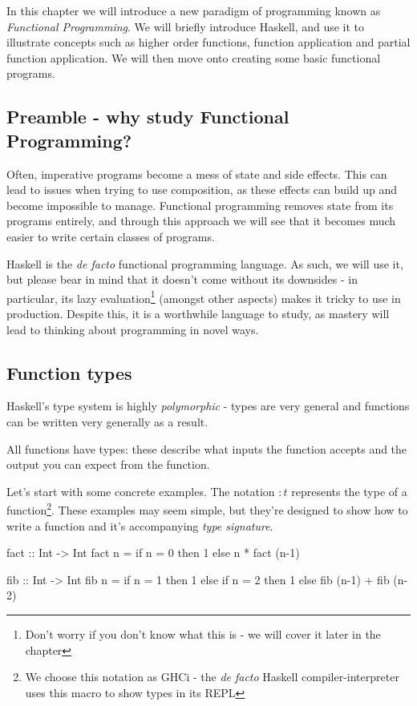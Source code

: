 \documentclass[../alevelcs.tex]{subfiles}
\begin{document}
	In this chapter we will introduce a new paradigm of programming known as \textit{Functional Programming}. We will briefly introduce Haskell, and use it to illustrate concepts such as higher order functions, function application and partial function application. We will then move onto creating some basic functional programs.
	\tableofcontents
	\newpage
	
	\subsection{Preamble - why study Functional Programming?}
	Often, imperative programs become a mess of state and side effects. This can lead to issues when trying to use composition, as these effects can build up and become impossible to manage. Functional programming removes state from its programs entirely, and through this approach we will see that it becomes much easier to write certain classes of programs.

	Haskell is the \textit{de facto} functional programming language. As such, we will use it, but please bear in mind that it doesn't come without its downsides - in particular, its lazy evaluation\footnote{Don't worry if you don't know what this is - we will cover it later in the chapter} (amongst other aspects) makes it tricky to use in production. Despite this, it is a worthwhile language to study, as mastery will lead to thinking about programming in novel ways.

	\subsection{Function types}
	Haskell's type system is highly \textit{polymorphic} - types are very general and functions can be written very generally as a result.

	All functions have types: these describe what inputs the function accepts and the output you can expect from the function.

	Let's start with some concrete examples. The notation $:t$ represents the type of a function\footnote{We choose this notation as GHCi - the \textit{de facto} Haskell compiler-interpreter uses this macro to show types in its REPL}. These examples may seem simple, but they're designed to show how to write a function and it's accompanying \textit{type signature}.

	fact :: Int -> Int
	fact n = if n = 0 then 1 else n * fact (n-1)

	fib :: Int -> Int
	fib n = if n = 1 then 1
		else if n = 2 then 1
			else fib (n-1) + fib (n-2)
	
\end{document}
